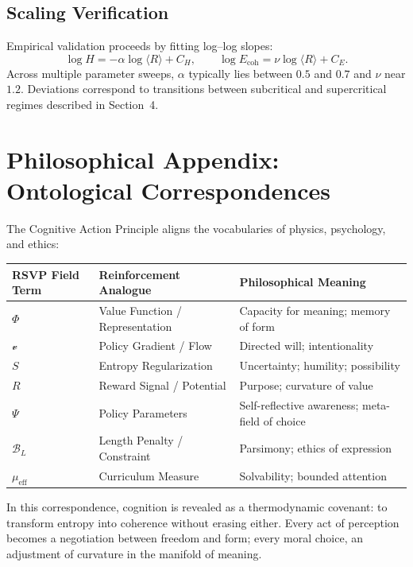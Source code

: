 \documentclass[11pt]{article}
\begin{document}
\subsection{Scaling Verification}

Empirical validation proceeds by fitting log–log slopes:
\[
\log H = -\alpha \log \langle R\rangle + C_H,
\qquad
\log E_{\mathrm{coh}} = \nu \log \langle R\rangle + C_E.
\]
Across multiple parameter sweeps, $\alpha$ typically lies between $0.5$ and $0.7$ and $\nu$ near $1.2$.  
Deviations correspond to transitions between subcritical and supercritical regimes described in Section~4.

\renewcommand{\thesection}{C}
\section{Philosophical Appendix: Ontological Correspondences}

The Cognitive Action Principle aligns the vocabularies of physics, psychology, and ethics:

\begin{center}
\begin{tabular}{lll}
\toprule
\textbf{RSVP Field Term} & \textbf{Reinforcement Analogue} & \textbf{Philosophical Meaning} \\
\midrule
$\Phi$ & Value Function / Representation & Capacity for meaning; memory of form \\
$\mathcal{v}$ & Policy Gradient / Flow & Directed will; intentionality \\
$S$ & Entropy Regularization & Uncertainty; humility; possibility \\
$R$ & Reward Signal / Potential & Purpose; curvature of value \\
$\Psi$ & Policy Parameters & Self-reflective awareness; meta-field of choice \\
$\mathcal{B}_L$ & Length Penalty / Constraint & Parsimony; ethics of expression \\
$\mu_{\mathrm{eff}}$ & Curriculum Measure & Solvability; bounded attention \\
\bottomrule
\end{tabular}
\end{center}

In this correspondence, cognition is revealed as a thermodynamic covenant: 
to transform entropy into coherence without erasing either.  
Every act of perception becomes a negotiation between freedom and form;  
every moral choice, an adjustment of curvature in the manifold of meaning.
\end{document}
